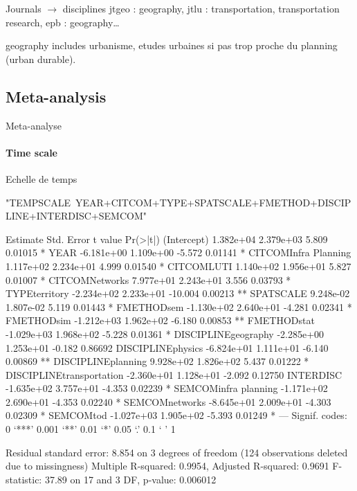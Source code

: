 Journals $\rightarrow$ disciplines
jtgeo : geography, jtlu : transportation, transportation research, epb : geography\ldots

geography includes urbanisme, etudes urbaines si pas trop proche du planning (urban durable).







\subsection{Meta-analysis}{Meta-analyse}

\paragraph{Time scale}{Echelle de temps}

"TEMPSCALE~YEAR+CITCOM+TYPE+SPATSCALE+FMETHOD+DISCIPLINE+INTERDISC+SEMCOM"

                           Estimate Std. Error t value Pr(>|t|)   
(Intercept)               1.382e+04  2.379e+03   5.809  0.01015 * 
YEAR                     -6.181e+00  1.109e+00  -5.572  0.01141 * 
CITCOMInfra Planning      1.117e+02  2.234e+01   4.999  0.01540 * 
CITCOMLUTI                1.140e+02  1.956e+01   5.827  0.01007 * 
CITCOMNetworks            7.977e+01  2.243e+01   3.556  0.03793 * 
TYPEterritory            -2.234e+02  2.233e+01 -10.004  0.00213 **
SPATSCALE                 9.248e-02  1.807e-02   5.119  0.01443 * 
FMETHODsem               -1.130e+02  2.640e+01  -4.281  0.02341 * 
FMETHODsim               -1.212e+03  1.962e+02  -6.180  0.00853 **
FMETHODstat              -1.029e+03  1.968e+02  -5.228  0.01361 * 
DISCIPLINEgeography      -2.285e+00  1.253e+01  -0.182  0.86692   
DISCIPLINEphysics        -6.824e+01  1.111e+01  -6.140  0.00869 **
DISCIPLINEplanning        9.928e+02  1.826e+02   5.437  0.01222 * 
DISCIPLINEtransportation -2.360e+01  1.128e+01  -2.092  0.12750   
INTERDISC                -1.635e+02  3.757e+01  -4.353  0.02239 * 
SEMCOMinfra planning     -1.171e+02  2.690e+01  -4.353  0.02240 * 
SEMCOMnetworks           -8.645e+01  2.009e+01  -4.303  0.02309 * 
SEMCOMtod                -1.027e+03  1.905e+02  -5.393  0.01249 * 
---
Signif. codes:  0 ‘***’ 0.001 ‘**’ 0.01 ‘*’ 0.05 ‘.’ 0.1 ‘ ’ 1

Residual standard error: 8.854 on 3 degrees of freedom
  (124 observations deleted due to missingness)
Multiple R-squared:  0.9954,	Adjusted R-squared:  0.9691 
F-statistic: 37.89 on 17 and 3 DF,  p-value: 0.006012

